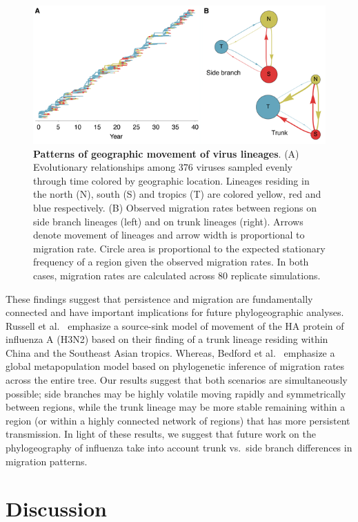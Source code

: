 \documentclass[11pt,oneside,letterpaper]{article}
\begin{document}
\begin{figure}[tb]
	\centering
	\includegraphics{figures/spatial}
	\caption{\textbf{Patterns of geographic movement of virus lineages}. (A) Evolutionary relationships among 376 viruses sampled evenly through time colored by geographic location. Lineages residing in the north (N), south (S) and tropics (T) are colored yellow, red and blue respectively. (B) Observed migration rates between regions on side branch lineages (left) and on trunk lineages (right). Arrows denote movement of lineages and arrow width is proportional to migration rate. Circle area is proportional to the expected stationary frequency of a region given the observed migration rates.  In both cases, migration rates are calculated across 80 replicate simulations.}
	\label{spatial}
\end{figure}

These findings suggest that persistence and migration are fundamentally connected and have important implications for future phylogeographic analyses.  Russell et al.\ \cite{Russell08} emphasize a source-sink model of movement of the HA protein of influenza A (H3N2) based on their finding of a trunk lineage residing within China and the Southeast Asian tropics.  Whereas, Bedford et al.\ \cite{Bedford10} emphasize a global metapopulation model based on phylogenetic inference of migration rates across the entire tree.  Our results suggest that both scenarios are simultaneously possible; side branches may be highly volatile moving rapidly and symmetrically between regions, while the trunk lineage may be more stable remaining within a region (or within a highly connected network of regions) that has more persistent transmission.  In light of these results, we suggest that future work on the phylogeography of influenza take into account trunk vs.\ side branch differences in migration patterns.

\section*{Discussion}
\end{document}

